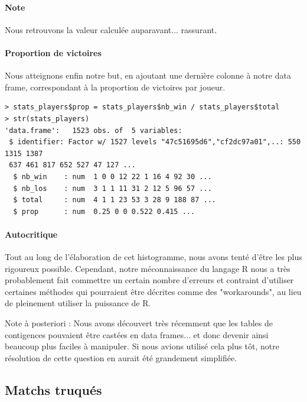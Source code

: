 \documentclass{report}
\begin{document}
\begin{appendices}
\paragraph{Note}
Nous retrouvons la valeur calculée auparavant... rassurant.
\paragraph{Proportion de victoires}
Nous atteignons enfin notre but, en ajoutant une dernière colonne à notre data
frame, correspondant à la proportion de victoires par joueur.
\begin{lstlisting}
> stats_players$prop = stats_players$nb_win / stats_players$total
> str(stats_players)
'data.frame':   1523 obs. of  5 variables:
 $ identifier: Factor w/ 1527 levels "47c51695d6","cf2dc97a01",..: 550 1315 1387
 637 461 817 652 527 47 127 ...
  $ nb_win    : num  1 0 0 12 22 1 16 4 92 30 ...
  $ nb_los    : num  3 1 1 11 31 2 12 5 96 57 ...
  $ total     : num  4 1 1 23 53 3 28 9 188 87 ...
  $ prop      : num  0.25 0 0 0.522 0.415 ...
\end{lstlisting}
\paragraph{Autocritique}
Tout au long de l'élaboration de cet histogramme, nous avons tenté d'être les
plus rigoureux possible. Cependant, notre méconnaissance du langage R nous a
très probablement fait commettre un certain nombre d'erreurs et contraint
d'utiliser certaines méthodes qui pourraient être décrites comme des
"workarounds", au lieu de pleinement utiliser la puissance de R.

Note à posteriori : Nous avons découvert très récemment que les tables de
contigences pouvaient être castées en data frames... et donc devenir ainsi
beaucoup plus faciles à manipuler. Si nous avions utilisé cela plus tôt, notre
résolution de cette question en aurait été grandement simplifiée. %

\subsection{Matchs truqués}

\end{appendices}
\end{document}
